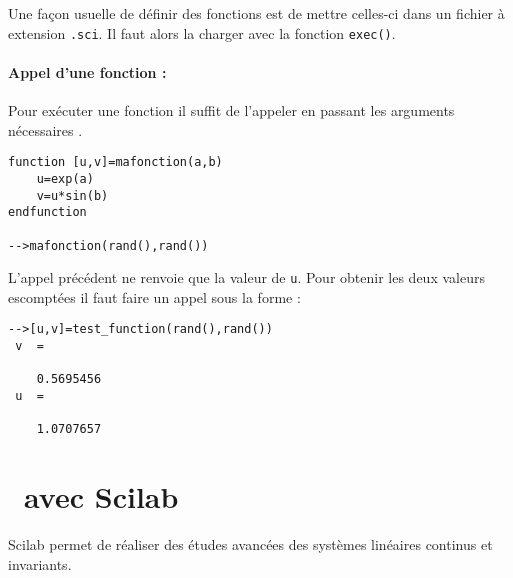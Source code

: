 Une façon usuelle de définir des fonctions est de mettre 
celles-ci dans un fichier à extension \verb?.sci?. 
Il faut alors la charger avec la fonction \verb?exec()?.

\paragraph{Appel d'une fonction :}
Pour exécuter une fonction il suffit de l'appeler en passant les arguments nécessaires .
\begin{code}
\begin{verbatim}
function [u,v]=mafonction(a,b)
    u=exp(a)
    v=u*sin(b)
endfunction

-->mafonction(rand(),rand())
\end{verbatim}
\end{code}
L'appel précédent ne renvoie que la valeur de \verb?u?. 
Pour obtenir les deux valeurs escomptées il faut faire un appel sous la forme  :
\begin{code}
\begin{verbatim}
-->[u,v]=test_function(rand(),rand())
 v  =
 
    0.5695456  
 u  =
 
    1.0707657  
\end{verbatim}
\end{code}



\newpage
\section{\SLCI~avec Scilab}

Scilab permet de réaliser des études avancées des systèmes linéaires continus et invariants.


